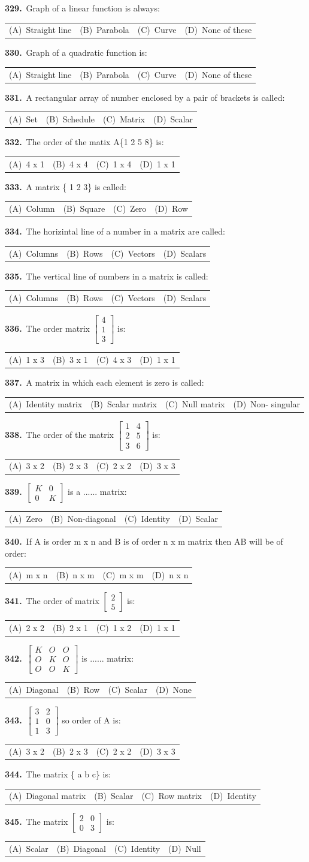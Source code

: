 \documentclass[11pt,a4paper]{article}
\makeatletter
\newcommand{\mcq}[6]{%
  \Needspace{4\baselineskip}%
  \par\medskip\noindent\textbf{#1.}\ #2\par\nopagebreak
  \noindent\begin{tabularx}{\linewidth}{@{\hspace{1.5em}}*{4}{>{\raggedright\arraybackslash}X}@{}}
    (A)~#3 & (B)~#4 & (C)~#5 & (D)~#6
  \end{tabularx}\par}
\makeatother
\begin{document}
\mcq{329}{Graph of a linear function is always:}{Straight line}{Parabola}{Curve}{None of these}
\mcq{330}{Graph of a quadratic function is:}{Straight line}{Parabola}{Curve}{None of these}
\mcq{331}{A rectangular array of number enclosed by a pair of brackets is called:}{Set}{Schedule}{Matrix}{Scalar}
\mcq{332}{The order of the matix A\{1 2 5 8\} is:}{4 x 1}{4 x 4}{1 x 4}{1 x 1}
\mcq{333}{A matrix \{ 1 2 3\} is called:}{Column}{Square}{Zero}{Row}
\mcq{334}{The horizintal line of a number in a matrix are called:}{Columns}{Rows}{Vectors}{Scalars}
\mcq{335}{The vertical line of numbers in a matrix is called:}{Columns}{Rows}{Vectors}{Scalars}
\mcq{336}{The order matrix $\begin{bmatrix}4\\1\\3\end{bmatrix}$ is:}{1 x 3}{3 x 1}{4 x 3}{1 x 1}
\mcq{337}{A matrix in which each element is zero is called:}{Identity matrix}{Scalar matrix}{Null matrix}{Non- singular}
\mcq{338}{The order of the matrix $\begin{bmatrix}1&4\\2&5\\3&6\end{bmatrix}$ is:}{3 x 2}{2 x 3}{2 x 2}{3 x 3}
\mcq{339}{$\begin{bmatrix}K&0\\0&K\end{bmatrix}$ is a ...... matrix:}{Zero}{Non-diagonal}{Identity}{Scalar}
\mcq{340}{If A is order m x n and B is of order n x m matrix then AB will be of order:}{m x n}{n x m}{m x m}{n x n}
\mcq{341}{The order of matrix $\begin{bmatrix}2\\5\end{bmatrix}$ is:}{2 x 2}{2 x 1}{1 x 2}{1 x 1}
\mcq{342}{$\begin{bmatrix}K&O&O\\O&K&O\\O&O&K\end{bmatrix}$ is ...... matrix:}{Diagonal}{Row}{Scalar}{None}
\mcq{343}{$\begin{bmatrix}3&2\\1&0\\1&3\end{bmatrix}$ so order of A is:}{3 x 2}{2 x 3}{2 x 2}{3 x 3}
\mcq{344}{The matrix \{ a b c\} is:}{Diagonal matrix}{Scalar}{Row matrix}{Identity}
\mcq{345}{The matrix $\begin{bmatrix}2&0\\0&3\end{bmatrix}$ is:}{Scalar}{Diagonal}{Identity}{Null}
\end{document}
